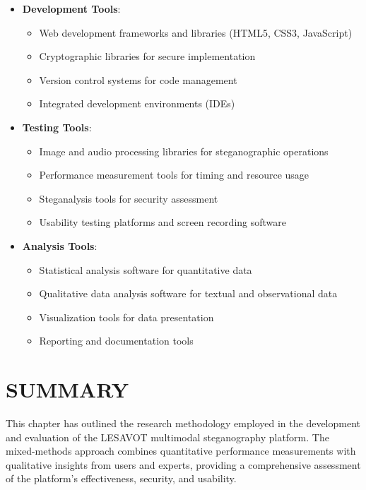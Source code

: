 \documentclass[12pt, a4paper, oneside]{book}
\begin{document}
\begin{itemize}[leftmargin=*]
    \item \textbf{Development Tools}:
    \begin{itemize}
        \item Web development frameworks and libraries (HTML5, CSS3, JavaScript)
        \item Cryptographic libraries for secure implementation
        \item Version control systems for code management
        \item Integrated development environments (IDEs)
    \end{itemize}

    \item \textbf{Testing Tools}:
    \begin{itemize}
        \item Image and audio processing libraries for steganographic operations
        \item Performance measurement tools for timing and resource usage
        \item Steganalysis tools for security assessment
        \item Usability testing platforms and screen recording software
    \end{itemize}

    \item \textbf{Analysis Tools}:
    \begin{itemize}
        \item Statistical analysis software for quantitative data
        \item Qualitative data analysis software for textual and observational data
        \item Visualization tools for data presentation
        \item Reporting and documentation tools
    \end{itemize}
\end{itemize}

\section{SUMMARY}

This chapter has outlined the research methodology employed in the development and evaluation of the LESAVOT multimodal steganography platform. The mixed-methods approach combines quantitative performance measurements with qualitative insights from users and experts, providing a comprehensive assessment of the platform's effectiveness, security, and usability.
\end{document}
